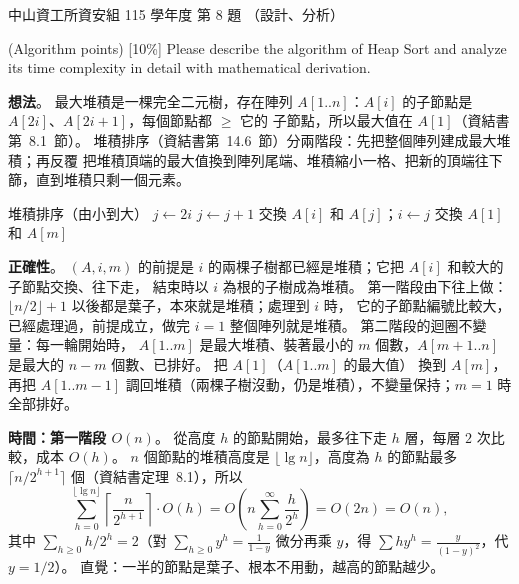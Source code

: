 \begin{pastexam}[label={px:nsysu-115-dmalg-07}]{中山資工所資安組 115 學年度 第 8 題}
（設計、分析）

(Algorithm points) {[}10\%{]} Please describe the algorithm of Heap Sort and analyze its time complexity in detail with mathematical derivation.
\end{pastexam}

\begin{pastsoln}
\textbf{想法}。 最大堆積是一棵完全二元樹，存在陣列 $A[1..n]$：$A[i]$ 的子節點是 $A[2i]$、$A[2i + 1]$，每個節點都 $\ge$ 它的
子節點，所以最大值在 $A[1]$（資結書第~8.1~節）。 堆積排序（資結書第~14.6~節）分兩階段：先把整個陣列建成最大堆積；再反覆
把堆積頂端的最大值換到陣列尾端、堆積縮小一格、把新的頂端往下篩，直到堆積只剩一個元素。

\begin{pseudo}{堆積排序（由小到大）}
 
        \State $j \gets 2i$
            \State $j \gets j + 1$ 
        \EndIf
            \State \Return
        \EndIf
        \State 交換 $A[i]$ 和 $A[j]$；$i \gets j$
    \EndWhile
\EndProcedure
\Statex
{}
     
        \State {}
    \EndFor
     
        \State 交換 $A[1]$ 和 $A[m]$ 
        \State {}
    \EndFor
\EndProcedure
\end{pseudo}

\textbf{正確性}。 $(A, i, m)$ 的前提是 $i$ 的兩棵子樹都已經是堆積；它把 $A[i]$ 和較大的子節點交換、往下走，
結束時以 $i$ 為根的子樹成為堆積。 第一階段由下往上做：$\lfloor n/2 \rfloor + 1$ 以後都是葉子，本來就是堆積；處理到 $i$ 時，
它的子節點編號比較大，已經處理過，前提成立，做完 $i = 1$ 整個陣列就是堆積。 第二階段的迴圈不變量：每一輪開始時，
$A[1..m]$ 是最大堆積、裝著最小的 $m$ 個數，$A[m+1..n]$ 是最大的 $n - m$ 個數、已排好。 把 $A[1]$（$A[1..m]$ 的最大值）
換到 $A[m]$，再把 $A[1..m-1]$ 調回堆積（兩棵子樹沒動，仍是堆積），不變量保持；$m = 1$ 時全部排好。

\textbf{時間：第一階段 $O(n)$}。  從高度 $h$ 的節點開始，最多往下走 $h$ 層，每層 $2$ 次比較，成本 $O(h)$。
$n$ 個節點的堆積高度是 $\lfloor \lg n \rfloor$，高度為 $h$ 的節點最多 $\lceil n / 2^{h+1} \rceil$ 個（資結書定理~8.1），所以
\[
\sum_{h=0}^{\lfloor \lg n \rfloor} \left\lceil \frac{n}{2^{h+1}} \right\rceil \cdot O(h)
= O\!\left(n \sum_{h=0}^{\infty} \frac{h}{2^{h}}\right) = O(2n) = O(n),
\]
其中 $\sum_{h \ge 0} h/2^h = 2$（對 $\sum_{h \ge 0} y^h = \frac{1}{1-y}$ 微分再乘 $y$，得 $\sum h y^h = \frac{y}{(1-y)^2}$，代 $y = 1/2$）。
直覺：一半的節點是葉子、根本不用動，越高的節點越少。


\end{pastsoln}
